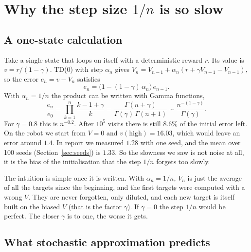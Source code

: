 \section{Why the step size \texorpdfstring{$1/n$}{1/n} is so slow}
\label{sec:steps}

\subsection{A one-state calculation}

Take a single state that loops on itself with a deterministic reward $r$. Its value is $v = r/(1-\gamma)$. TD(0) with step $\alpha_n$ gives $V_n = V_{n-1} + \alpha_n (r + \gamma V_{n-1} - V_{n-1})$, so the error $e_n = v - V_n$ satisfies
\begin{equation}
e_n = \big(1 - (1-\gamma)\,\alpha_n\big)\, e_{n-1}.
\label{eq:onestate}
\end{equation}
With $\alpha_n = 1/n$ the product can be written with Gamma functions,
\[
\frac{e_n}{e_0} = \prod_{k=1}^{n} \frac{k - 1 + \gamma}{k} = \frac{\Gamma(n+\gamma)}{\Gamma(\gamma)\,\Gamma(n+1)} \sim \frac{n^{-(1-\gamma)}}{\Gamma(\gamma)} .
\]
For $\gamma = 0.8$ this is $n^{-0.2}$. After $10^5$ visits there is still $8.6\%$ of the initial error left. On the robot we start from $V = 0$ and $v(\text{high}) = 16.03$, which would leave an error around $1.4$. In report we measured $1.28$ with one seed, and the mean over 100 seeds (Section~\ref{sec:seeds}) is $1.33$. So the slowness we saw is not noise at all, it is the bias of the initialisation that the step $1/n$ forgets too slowly.

The intuition is simple once it is written. With $\alpha_n = 1/n$, $V_n$ is just the average of all the targets since the beginning, and the first targets were computed with a wrong $V$. They are never forgotten, only diluted, and each new target is itself built on the biased $V$ (that is the factor $\gamma$). If $\gamma = 0$ the step $1/n$ would be perfect. The closer $\gamma$ is to one, the worse it gets.

\subsection{What stochastic approximation predicts}


